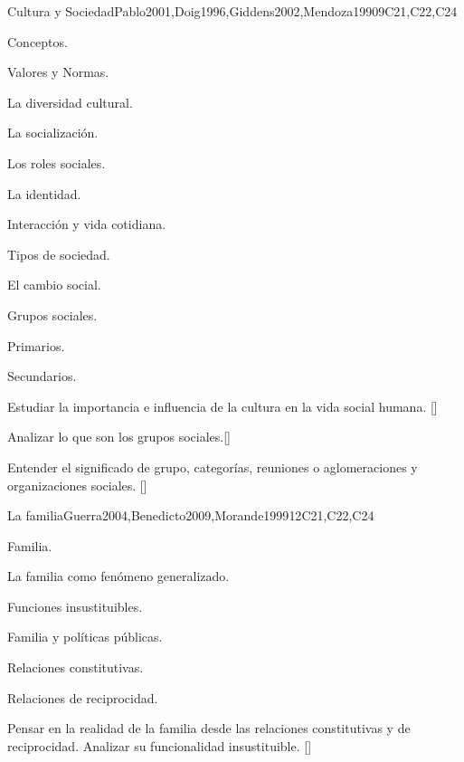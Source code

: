 \begin{syllabus}
\begin{unit}{}{Cultura y Sociedad}{Pablo2001,Doig1996,Giddens2002,Mendoza1990}{9}{C21,C22,C24}
\begin{topics}
    \item Conceptos.
    \item Valores y Normas.
    \item La diversidad cultural.
    \item La socialización.
    \item Los roles sociales.
    \item La identidad.
    \item Interacción y vida cotidiana.
    \item Tipos de sociedad.
    \item El cambio social.
    \item Grupos sociales.
    \begin{subtopics}
	    \item Primarios.
	    \item Secundarios.
    \end{subtopics}
\end{topics}

\begin{learningoutcomes}
    \item Estudiar la importancia e influencia de la cultura en la vida social humana. [\Familiarity]
    \item Analizar lo que son los grupos sociales.[\Familiarity]
    \item Entender el significado de grupo, categorías, reuniones o aglomeraciones y organizaciones sociales. [\Familiarity]
\end{learningoutcomes}
\end{unit}

\begin{unit}{}{La familia}{Guerra2004,Benedicto2009,Morande1999}{12}{C21,C22,C24}
\begin{topics}
    \item Familia.
    \item La familia como fenómeno generalizado.
    \item Funciones insustituibles.
    \item Familia y políticas públicas.
    \item Relaciones constitutivas.
    \item Relaciones de reciprocidad.
\end{topics}
\begin{learningoutcomes}
	\item Pensar en la realidad de la familia desde las relaciones constitutivas y de reciprocidad. Analizar su funcionalidad insustituible. [\Familiarity]
\end{learningoutcomes}
\end{unit}


\end{syllabus}
